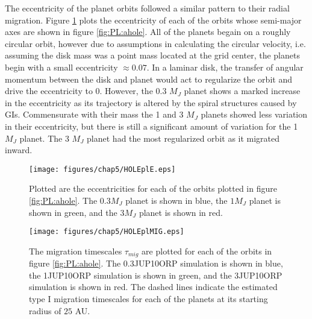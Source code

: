 The eccentricity of the planet orbits followed a similar pattern to their radial migration. Figure \ref{fig:PL:ehole} plots the eccentricity of each of the orbits whose semi-major axes are shown in figure \ref{fig:PL:ahole}. All of the planets begain on a roughly circular orbit, however due to assumptions in calculating the circular velocity, i.e. assuming the disk mass was a point mass located at the grid center, the planets begin with a small eccentricity $\approx 0.07$. In a laminar disk, the transfer of angular momentum between the disk and planet would act to regularize the orbit and drive the eccentricity to 0. However, the 0.3 $M_J$ planet shows a marked increase in the eccentricity as its trajectory is altered by the spiral structures caused by GIs. Commensurate with their mass the 1 and 3 $M_J$ planets showed less variation in their eccentricity, but there is still a significant amount of variation for the 1 $M_J$ planet. The 3 $M_J$ planet had the most regularized orbit as it migrated inward.

\begin{figure}[p]
\centering
\texttt{[image: figures/chap5/HOLEplE.eps]}
\caption[NEED TAGLINE]{Plotted are the eccentricities for each of the orbits plotted in figure \ref{fig:PL:ahole}. The $0.3 M_J$ planet is shown in blue, the $1 M_J$ planet is shown in green, and  the $3 M_J$ planet is shown in red.}
\label{fig:PL:ehole}
\end{figure}

\begin{figure}[p]
\centering
\texttt{[image: figures/chap5/HOLEplMIG.eps]}
\caption[NEED TAGLINE]{The migration timescales $\tau_{mig}$ are plotted for each of the orbits in figure \ref{fig:PL:ahole}. The 0.3JUP10ORP simulation is shown in blue, the 1JUP10ORP simulation is shown in green, and the 3JUP10ORP simulation is shown in red. The dashed lines indicate the estimated type I migration timescales for each of the planets at its starting radius of $25$ AU.}
\label{fig:PL:mighole}
\end{figure}

